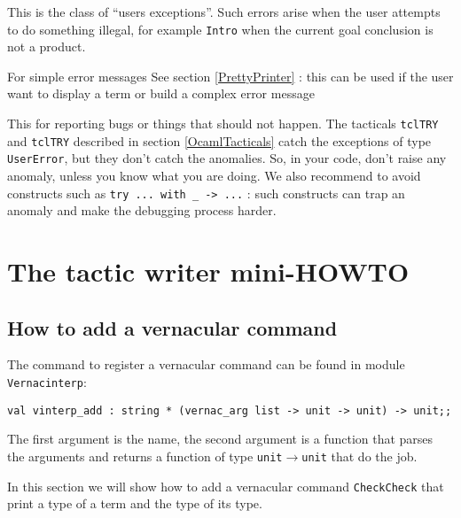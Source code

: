 \begin{description}
    {This is the class of ``users exceptions''. Such errors arise when 
      the user attempts to do something illegal, for example \texttt{Intro}
      when the current goal conclusion is not a product.}

    {For simple error messages}
    {See section \ref{PrettyPrinter} : this can be used if the user
      want to display a term or build a complex error message}

    {This for reporting bugs or things that should not
      happen. The tacticals \texttt{tclTRY} and
      \texttt{tclTRY} described in section \ref{OcamlTacticals} catch the
      exceptions of type \texttt{UserError}, but they don't catch the
      anomalies. So, in your code, don't raise any anomaly, unless you
      know what you are doing. We also recommend to avoid constructs
      such as \texttt{try ... with \_ -> ...} : such constructs can trap 
      an anomaly and make the debugging process harder.}

\end{description}

\section{The tactic writer mini-HOWTO}

\subsection{How to add a vernacular command}

The command to register a vernacular command can be found
in module \texttt{Vernacinterp}:

\begin{verbatim}
val vinterp_add : string * (vernac_arg list -> unit -> unit) -> unit;;
\end{verbatim}

The first argument is the name, the second argument is a function that
parses the arguments and returns a function of type
\texttt{unit}$\rightarrow$\texttt{unit} that do the job.

In this section we will show how to add a vernacular command
\texttt{CheckCheck} that print a type of a term and the type of its
type.

